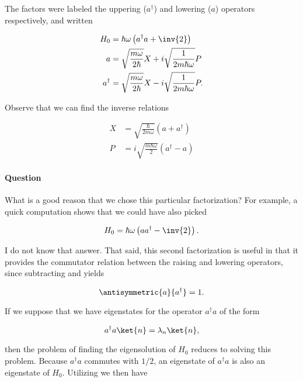 The factors were labeled the uppering ($a^\dagger$) and lowering ($a$) operators respectively, and written

\begin{align}\label{eqn:phy456ps1:110}
H_0 &= \hbar \omega \left( a^\dagger a + \inv{2} \right) \\
a &= \sqrt{\frac{m \omega}{2 \hbar}} X + i \sqrt{\frac{1}{2m \hbar \omega}} P \\
a^\dagger &= \sqrt{\frac{m \omega}{2 \hbar}} X - i \sqrt{\frac{1}{2m \hbar \omega}} P.
\end{align}

Observe that we can find the inverse relations

\begin{align}\label{eqn:phy456ps1:115}
X &= \sqrt{ \frac{\hbar}{2 m \omega} } \left( a + a^\dagger \right) \\
P &= i \sqrt{ \frac{m \hbar \omega}{2} } \left( a^\dagger  - a \right)
\end{align}

\paragraph{Question}
What is a good reason that we chose this particular factorization?  For example, a quick computation shows that we could have also picked

\begin{equation}\label{eqn:phy456ps1:130}
H_0 = \hbar \omega \left( a a^\dagger - \inv{2} \right).
\end{equation}

I do not know that answer.  That said, this second factorization is useful in that it provides the commutator relation between the raising and lowering operators, since subtracting  and  yields

\begin{equation}\label{eqn:phy456ps1:150}
\antisymmetric{a}{a^\dagger} = 1.
\end{equation}

If we suppose that we have eigenstates for the operator $a^\dagger a$ of the form

\begin{equation}\label{eqn:phy456ps1:200}
a^\dagger a \ket{n} = \lambda_n \ket{n},
\end{equation}

then the problem of finding the eigensolution of $H_0$ reduces to solving this problem.  Because $a^\dagger a$ commutes with $1/2$, an eigenstate of $a^\dagger a$ is also an eigenstate of $H_0$.  Utilizing  we then have

